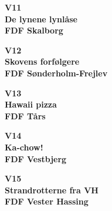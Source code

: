 \vspace*{2cm}
\begin{center}
{\fontsize{300}{60}\selectfont\textbf{\textcolor{søblå}{V11}}\\}
{\fontsize{30}{50}\selectfont\textbf{\textcolor{søblå}{De lynene lynlåse}}\\}
{\fontsize{20}{50}\selectfont\textbf{FDF Skalborg}\\}
\end{center}
\newpage

\vspace*{2cm}
\begin{center}
{\fontsize{300}{60}\selectfont\textbf{\textcolor{søblå}{V12}}\\}
{\fontsize{30}{50}\selectfont\textbf{\textcolor{søblå}{Skovens forfølgere}}\\}
{\fontsize{20}{50}\selectfont\textbf{FDF Sønderholm-Frejlev}\\}
\end{center}
\newpage

\vspace*{2cm}
\begin{center}
{\fontsize{300}{60}\selectfont\textbf{\textcolor{søblå}{V13}}\\}
{\fontsize{30}{50}\selectfont\textbf{\textcolor{søblå}{Hawaii pizza}}\\}
{\fontsize{20}{50}\selectfont\textbf{FDF Tårs}\\}
\end{center}
\newpage

\vspace*{2cm}
\begin{center}
{\fontsize{300}{60}\selectfont\textbf{\textcolor{søblå}{V14}}\\}
{\fontsize{30}{50}\selectfont\textbf{\textcolor{søblå}{Ka-chow!}}\\}
{\fontsize{20}{50}\selectfont\textbf{FDF Vestbjerg}\\}
\end{center}
\newpage

\vspace*{2cm}
\begin{center}
{\fontsize{300}{60}\selectfont\textbf{\textcolor{søblå}{V15}}\\}
{\fontsize{30}{50}\selectfont\textbf{\textcolor{søblå}{Strandrotterne fra VH}}\\}
{\fontsize{20}{50}\selectfont\textbf{FDF Vester Hassing}\\}
\end{center}
\newpage


